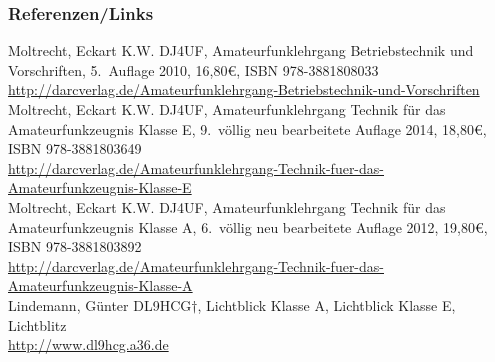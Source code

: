 \begin{frame}
    \frametitle{Referenzen/Links}
    \hypertarget{refs}{}
    \footnotesize

    \begin{thebibliography}{}
            Moltrecht, Eckart K.W. DJ4UF, Amateurfunklehrgang Betriebstechnik und Vorschriften, 5.~Auflage 2010, 16,80€, ISBN 978-3881808033 \\
                        \url{http://darcverlag.de/Amateurfunklehrgang-Betriebstechnik-und-Vorschriften}
           Moltrecht, Eckart K.W. DJ4UF, Amateurfunklehrgang Technik für das Amateurfunkzeugnis Klasse E, 9.~völlig neu bearbeitete Auflage 2014, 18,80€, ISBN 978-3881803649 \\
                        \url{http://darcverlag.de/Amateurfunklehrgang-Technik-fuer-das-Amateurfunkzeugnis-Klasse-E} \\
           Moltrecht, Eckart K.W. DJ4UF, Amateurfunklehrgang Technik für das Amateurfunkzeugnis Klasse A, 6.~völlig neu bearbeitete Auflage 2012, 19,80€, ISBN 978-3881803892 \\
                        \url{http://darcverlag.de/Amateurfunklehrgang-Technik-fuer-das-Amateurfunkzeugnis-Klasse-A}\\
        	Lindemann, Günter DL9HCG$\dagger$, Lichtblick Klasse A, Lichtblick Klasse E, Lichtblitz \\
          \url{http://www.dl9hcg.a36.de}
    \end{thebibliography}

\end{frame}



